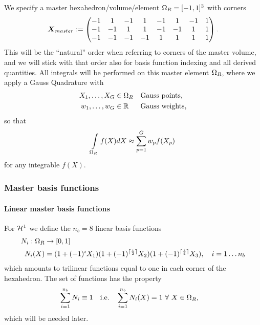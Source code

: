 We specify a master hexahedron/volume/element $\Omega_R = [-1,1]^3$ with corners
\begin{align*}
	\boldsymbol{X}_{master} := \left(\begin{matrix}-1 & 1 & -1 & 1 & -1 & 1 & -1 &1\\-1 & -1 & 1 & 1 & -1 & -1 & 1 &1\\-1 & -1 & -1 & -1 & 1 & 1 & 1 &1\\\end{matrix}\right).
\end{align*}
This will be the ``natural'' order when referring to corners of the master volume, and we will stick with that order also for basis function indexing and all derived quantities.
All integrals will be performed on this master element $\Omega_R$, where we apply a Gauss Quadrature with
\begin{align}
	X_1,\ldots,X_G  &\in \Omega_R &&\text{Gauss points},\\
	w_1,\ldots,w_G  &\in \mathbb{R} &&\text{Gauss weights},
\end{align}
so that
\begin{align}
	\int\limits_{\Omega_R}^{} f(X)dX \approx \sum\limits_{p=1}^{G} w_pf(X_p)\label{def:gaussintapprox}
\end{align}
for any integrable $f(X)$.
\subsubsection{Master basis functions}
\paragraph{Linear master basis functions}
For $\mathcal{H}^1$ we define the $n_b=8$ linear basis functions
\begin{align*}
	N_i:\Omega_R &\to [0,1]\\
	N_i(X)  &= (1+(-1)^{i}X_1)(1+(-1)^{\lceil\frac{i}{2}\rceil}X_2)(1+(-1)^{\lceil\frac{i}{4}\rceil}X_3),\quad i=1\ldots n_b
\end{align*}
which amounts to trilinear functions equal to one in each corner of the hexahedron.
The set of functions has the property
\begin{align}
	\sum\limits_{i=1}^{n_b}N_i &\equiv 1 & \text{i.e.}\quad \sum\limits_{i=1}^{n_b}N_i(X) &= 1 ~\forall~ X\in\Omega_R,\label{eq:basisfunsum}
\end{align}
which will be needed later.
